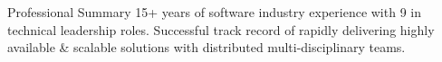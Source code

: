 \documentclass{resume} %
\begin{document}
\vspace{1em}

\begin{rSection}{Professional Summary}
15+ years of software industry experience with 9 in technical leadership roles. Successful track record of rapidly delivering highly available \& scalable solutions with distributed multi-disciplinary teams.
\end{rSection}

\end{document}
